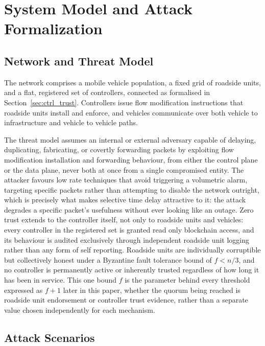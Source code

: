 \documentclass[final,5p,twocolumn]{elsarticle}
\theoremstyle{remark}
\theoremstyle{plain}
\begin{document}
\section{System Model and Attack Formalization}
\label{system_model}

\subsection{Network and Threat Model}
\label{sec:threat_model}

The network comprises a mobile vehicle population, a fixed grid of
roadside units, and a flat, registered set of controllers, connected as
formalised in Section~\ref{sec:ctrl_trust}. Controllers issue flow
modification instructions that roadside units install and enforce, and
vehicles communicate over both vehicle to infrastructure and vehicle to
vehicle paths.

The threat model assumes an internal or external adversary capable of
delaying, duplicating, fabricating, or covertly forwarding packets by
exploiting flow modification installation and forwarding behaviour, from
either the control plane or the data plane, never both at once from a
single compromised entity. The attacker favours low rate techniques that
avoid triggering a volumetric alarm, targeting specific packets rather
than attempting to disable the network outright, which is precisely what
makes selective time delay attractive to it: the attack degrades a
specific packet's usefulness without ever looking like an outage. Zero
trust extends to the controller itself, not only to roadside units and
vehicles: every controller in the registered set is granted read only
blockchain access, and its behaviour is audited exclusively through
independent roadside unit logging rather than any form of self reporting.
Roadside units are individually corruptible but collectively honest under
a Byzantine fault tolerance bound of $f<n/3$, and no controller is
permanently active or inherently trusted regardless of how long it has
been in service. This one bound $f$ is the parameter behind every
threshold expressed as $f{+}1$ later in this paper, whether the quorum
being reached is roadside unit endorsement or controller trust evidence,
rather than a separate value chosen independently for each mechanism.

\subsection{Attack Scenarios}
\label{sec:attack_scenarios}
\end{document}
